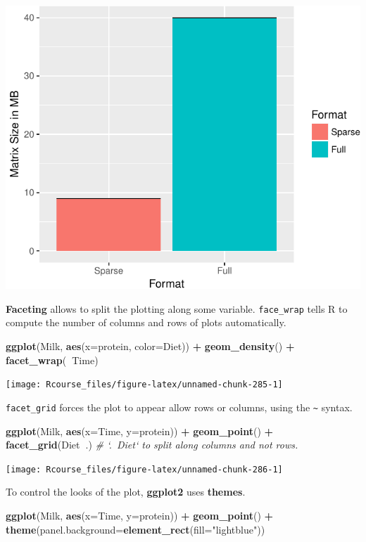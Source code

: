 \documentclass[]{book}
\newenvironment{Shaded}{\begin{snugshade}}{\end{snugshade}}
\newcommand{\CommentTok}[1]{\textcolor[rgb]{0.56,0.35,0.01}{\textit{#1}}}
\newcommand{\DataTypeTok}[1]{\textcolor[rgb]{0.13,0.29,0.53}{#1}}
\newcommand{\KeywordTok}[1]{\textcolor[rgb]{0.13,0.29,0.53}{\textbf{#1}}}
\newcommand{\NormalTok}[1]{#1}
\newcommand{\OperatorTok}[1]{\textcolor[rgb]{0.81,0.36,0.00}{\textbf{#1}}}
\newcommand{\StringTok}[1]{\textcolor[rgb]{0.31,0.60,0.02}{#1}}
\theoremstyle{definition}
\theoremstyle{definition}
\theoremstyle{definition}
\theoremstyle{remark}
\begin{document}
\includegraphics[width=0.5\linewidth]{Rcourse_files/figure-latex/unnamed-chunk-284-1}

\textbf{Faceting} allows to split the plotting along some variable.
\texttt{face\_wrap} tells R to compute the number of columns and rows of plots automatically.

\begin{Shaded}
\begin{Highlighting}[]
\KeywordTok{ggplot}\NormalTok{(Milk, }\KeywordTok{aes}\NormalTok{(}\DataTypeTok{x=}\NormalTok{protein, }\DataTypeTok{color=}\NormalTok{Diet)) }\OperatorTok{+}
\StringTok{  }\KeywordTok{geom_density}\NormalTok{() }\OperatorTok{+}
\StringTok{  }\KeywordTok{facet_wrap}\NormalTok{(}\OperatorTok{~}\NormalTok{Time)}
\end{Highlighting}
\end{Shaded}

\texttt{[image: Rcourse\_files/figure-latex/unnamed-chunk-285-1]}

\texttt{facet\_grid} forces the plot to appear allow rows or columns, using the \texttt{\textasciitilde{}} syntax.

\begin{Shaded}
\begin{Highlighting}[]
\KeywordTok{ggplot}\NormalTok{(Milk, }\KeywordTok{aes}\NormalTok{(}\DataTypeTok{x=}\NormalTok{Time, }\DataTypeTok{y=}\NormalTok{protein)) }\OperatorTok{+}
\StringTok{  }\KeywordTok{geom_point}\NormalTok{() }\OperatorTok{+}
\StringTok{  }\KeywordTok{facet_grid}\NormalTok{(Diet}\OperatorTok{~}\NormalTok{.) }\CommentTok{# `.~Diet` to split along columns and not rows.}
\end{Highlighting}
\end{Shaded}

\texttt{[image: Rcourse\_files/figure-latex/unnamed-chunk-286-1]}

To control the looks of the plot, \textbf{ggplot2} uses \textbf{themes}.

\begin{Shaded}
\begin{Highlighting}[]
\KeywordTok{ggplot}\NormalTok{(Milk, }\KeywordTok{aes}\NormalTok{(}\DataTypeTok{x=}\NormalTok{Time, }\DataTypeTok{y=}\NormalTok{protein)) }\OperatorTok{+}
\StringTok{  }\KeywordTok{geom_point}\NormalTok{() }\OperatorTok{+}
\StringTok{  }\KeywordTok{theme}\NormalTok{(}\DataTypeTok{panel.background=}\KeywordTok{element_rect}\NormalTok{(}\DataTypeTok{fill=}\StringTok{"lightblue"}\NormalTok{))}
\end{Highlighting}
\end{Shaded}
\end{document}
